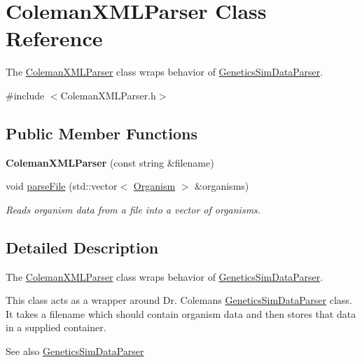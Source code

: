 \hypertarget{class_coleman_x_m_l_parser}{}\section{Coleman\+X\+M\+L\+Parser Class Reference}
\label{class_coleman_x_m_l_parser}


The \hyperlink{class_coleman_x_m_l_parser}{Coleman\+X\+M\+L\+Parser} class wraps behavior of \hyperlink{class_genetics_sim_data_parser}{Genetics\+Sim\+Data\+Parser}.  




{\ttfamily \#include $<$Coleman\+X\+M\+L\+Parser.\+h$>$}

\subsection*{Public Member Functions}
\begin{DoxyCompactItemize}
\item 
\hypertarget{class_coleman_x_m_l_parser_a8eda751b3cb0b3f94add5a24fddacbc1}{}{\bfseries Coleman\+X\+M\+L\+Parser} (const string \&filename)\label{class_coleman_x_m_l_parser_a8eda751b3cb0b3f94add5a24fddacbc1}

\item 
void \hyperlink{class_coleman_x_m_l_parser_ae168a5ae05ee145556a7b1f612fde3ea}{parse\+File} (std\+::vector$<$ \hyperlink{class_organism}{Organism} $>$ \&organisms)
\begin{DoxyCompactList}\small\item\em Reads organism data from a file into a vector of organisms. \end{DoxyCompactList}\end{DoxyCompactItemize}


\subsection{Detailed Description}
The \hyperlink{class_coleman_x_m_l_parser}{Coleman\+X\+M\+L\+Parser} class wraps behavior of \hyperlink{class_genetics_sim_data_parser}{Genetics\+Sim\+Data\+Parser}. 

This class acts as a wrapper around Dr. Coleman\textquotesingle{}s \hyperlink{class_genetics_sim_data_parser}{Genetics\+Sim\+Data\+Parser} class. It takes a filename which should contain organism data and then stores that data in a supplied container. \begin{DoxySeeAlso}{See also}
\hyperlink{class_genetics_sim_data_parser}{Genetics\+Sim\+Data\+Parser} 
\end{DoxySeeAlso}


